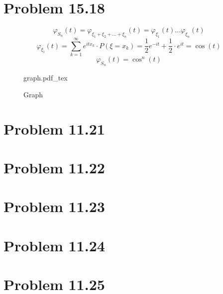 \documentclass[12pt,letterpaper]{article}
\newcommand{\incfig}[1]{%
    \def\svgwidth{\columnwidth}
    {#1.pdf_tex}
}
\begin{document}
\section*{Problem 15.18}

\[ \varphi_{S_n}(t) = \varphi_{\xi_1 + \xi_2 + \dots + \xi_n}(t) = \varphi_{\xi_1}(t) \dots \varphi_{\xi_n}(t) \]
\[ \varphi_{\xi_i}(t) = \sum_{k=1}^{\infty} e^{itx_k} \cdot P(\xi = x_k) =
\frac{1}{2} e^{-it} + \frac{1}{2} \cdot e^{it} =  \cos(t) \]
\[ \varphi_{S_n}(t) = \cos^n (t) \]

\begin{figure}[ht]
    \centering
    \incfig{graph}
    \caption{Graph}
    \label{fig:graph}
\end{figure}

\section*{Problem 11.21}


\section*{Problem 11.22}

\section*{Problem 11.23}

\section*{Problem 11.24}



\section*{Problem 11.25}

\end{document}
